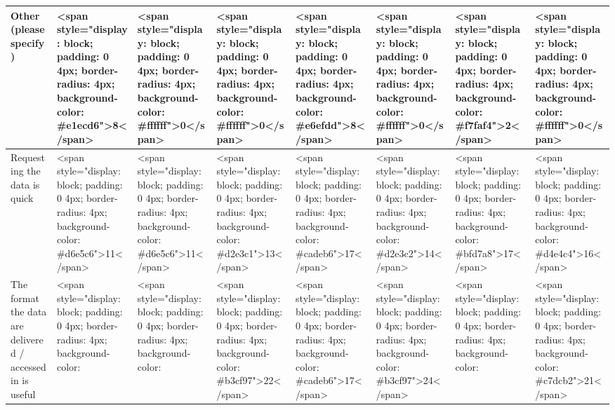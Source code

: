 \documentclass[
]{article}
\begin{document}
\begin{table}
\begin{tabular}[t]{l|l|l|l|l|l|l|l}
\hline
\hspace{1em}Other (please specify) & <span style="display: block; padding: 0 4px; border-radius: 4px; background-color: #e1ecd6">8</span> & <span style="display: block; padding: 0 4px; border-radius: 4px; background-color: #ffffff">0</span> & <span style="display: block; padding: 0 4px; border-radius: 4px; background-color: #ffffff">0</span> & <span style="display: block; padding: 0 4px; border-radius: 4px; background-color: #e6efdd">8</span> & <span style="display: block; padding: 0 4px; border-radius: 4px; background-color: #ffffff">0</span> & <span style="display: block; padding: 0 4px; border-radius: 4px; background-color: #f7faf4">2</span> & <span style="display: block; padding: 0 4px; border-radius: 4px; background-color: #ffffff">0</span>\\
\hline
\hspace{1em}Requesting the data is quick & <span style="display: block; padding: 0 4px; border-radius: 4px; background-color: #d6e5c6">11</span> & <span style="display: block; padding: 0 4px; border-radius: 4px; background-color: #d6e5c6">11</span> & <span style="display: block; padding: 0 4px; border-radius: 4px; background-color: #d2e3c1">13</span> & <span style="display: block; padding: 0 4px; border-radius: 4px; background-color: #cadeb6">17</span> & <span style="display: block; padding: 0 4px; border-radius: 4px; background-color: #d2e3c2">14</span> & <span style="display: block; padding: 0 4px; border-radius: 4px; background-color: #bfd7a8">17</span> & <span style="display: block; padding: 0 4px; border-radius: 4px; background-color: #d4e4c4">16</span>\\
\hline
\hspace{1em}The format the data are delivered / accessed in is useful & <span style="display: block; padding: 0 4px; border-radius: 4px; background-color: #96be70">28</span> & <span style="display: block; padding: 0 4px; border-radius: 4px; background-color: #84b256">33</span> & <span style="display: block; padding: 0 4px; border-radius: 4px; background-color: #b3cf97">22</span> & <span style="display: block; padding: 0 4px; border-radius: 4px; background-color: #cadeb6">17</span> & <span style="display: block; padding: 0 4px; border-radius: 4px; background-color: #b3cf97">24</span> & <span style="display: block; padding: 0 4px; border-radius: 4px; background-color: #9ec27a">26</span> & <span style="display: block; padding: 0 4px; border-radius: 4px; background-color: #c7dcb2">21</span>\\
\hline

\end{tabular}
\end{table}
\end{document}
